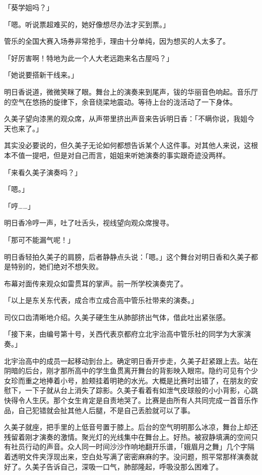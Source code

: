\documentclass[UTF8]{ctexart}
\begin{document}
    「葵学姐吗？」 

    「嗯。听说票超难买的，她好像想尽办法才买到票。」 

    管乐的全国大赛入场券非常抢手，理由十分单纯，因为想买的人太多了。 

    「好厉害啊！特地为此一个人大老远跑来名古屋吗？」 

    「她说要搭新干线来。」 

    明日香说道，微微笑眯了眼。舞台上的演奏来到尾声，钹的华丽音色响起。音乐厅的空气在悠扬的旋律下，余音绕梁地震动。等待上台的泷活动了一下身体。 

    久美子望向漆黑的观众席，从声带里挤出声音来告诉明日香：「不瞒你说，我姐今天也来了。」 

    其实没必要说的，但久美子无论如何都想告诉某个人这件事。对其他人来说，这根本不值一提吧，但是对自己而言，姐姐来听她演奏的事实跟奇迹没两样。 

    「来看久美子演奏吗？」 

    「嗯。」 

    「哼……」 

    明日香冷哼一声，吐了吐舌头，视线望向观众席搜寻。 

    「那可不能漏气呢！」 

    明日香轻拍久美子的肩膀，后者静静点头说：「嗯。」这个舞台对明日香和久美子都是特别的，她们绝对不想失败。 

    布幕对面传来观众如雷贯耳的掌声。前一所学校演奏完了。 

    「以上是东关东代表，成合市立成合高中管乐社带来的演奏。」 

    司仪口齿清晰地介绍。久美子硬生生从肺部挤出气体，借此吐出紧张感。 

    「接下来，由编号第十号，关西代表京都府立北宇治高中管乐社的同学为大家演奏。」 

    北宇治高中的成员一起移动到台上。确定明日香开步走，久美子赶紧跟上去。站在阴暗的后台，刚才那所高中的学生鱼贯离开舞台的背影映入眼帘。隐约可见有个少女珍而重之地捧着小号，脸颊挂着明艳的水光。大概是比赛时出错了，在朋友的安慰下，一下子就从台上消失了踪影。久美子看着有如泄气皮球般的小小背影，心跳快得令人生厌。那个女生肯定是自责地哭了。比赛是由所有人共同完成一首音乐作品，自己犯错就会扯其他人后腿，不是自己丢脸就可以了事。 

    久美子就座，把手里的上低音号置于膝上。后台的空气明明那么冰凉，舞台上却还残留着刚才演奏的激情。聚光灯的光线集中在舞台上。好热。被寂静填满的空间只有社员行动的声音。众人同一时间沙沙作响地翻开乐谱，「娥眉月之舞」几个字隔着透明文件夹浮现出来，空白处写满了密密麻麻的字。没问题，照平常那样演奏就好了。久美子告诉自己，深吸一口气，肺部隆起，呼吸没那么困难了。 
\end{document}

